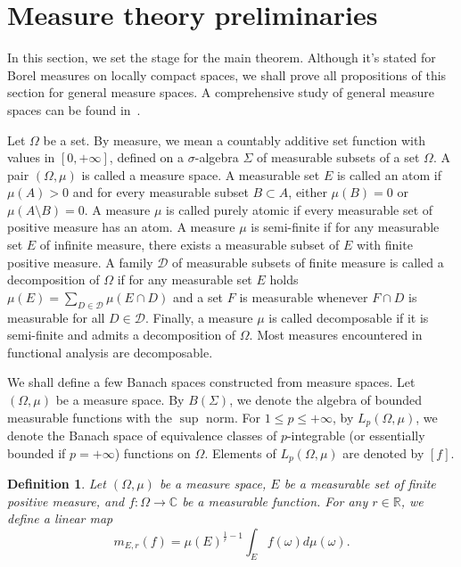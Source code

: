 \documentclass[12pt]{article}
\newtheorem{definition}[theorem]{Definition}
\begin{document}

\section{Measure theory preliminaries}
\label{MeasThPrelim}

In this section, we set the stage for the main theorem. Although it's stated 
for Borel measures on locally compact spaces, we shall prove all propositions of 
this section for general measure spaces. A comprehensive study of general 
measure spaces can be found in~\cite{FremMeasTh2}.

Let $\Omega$ be a set. By measure, we mean a countably additive set function 
with values in $[0,+\infty]$, defined on a $\sigma$-algebra $\Sigma$ of 
measurable subsets of a set $\Omega$. A pair $(\Omega,\mu)$ is 
called a measure space. A measurable set $E$ is called an atom 
if $\mu(A)>0$ and for every measurable subset $B\subset A$, either $\mu(B)=0$ 
or $\mu(A\setminus B)=0$. A measure $\mu$ is called purely atomic if every 
measurable set of positive measure has an atom. A measure $\mu$ is semi-finite 
if for any measurable set $E$ of infinite measure, there exists a measurable 
subset of $E$ with finite positive measure. A family $\mathcal{D}$ of 
measurable subsets of finite measure is called a decomposition of $\Omega$ if 
for any measurable set $E$ holds $\mu(E)=\sum_{D\in\mathcal{D}}\mu(E\cap D)$ 
and a set $F$ is measurable whenever $F\cap D$ is measurable for 
all $D\in\mathcal{D}$. Finally, a measure $\mu$ is called decomposable if it 
is semi-finite and admits a decomposition of $\Omega$. Most measures 
encountered in functional analysis are decomposable. 

We shall define a few Banach spaces constructed from measure spaces. 
Let $(\Omega,\mu)$ be a measure space. By $B(\Sigma)$, we denote the algebra of 
bounded measurable functions with the $\sup$ norm. For $1\leq p\leq +\infty$, 
by $L_p(\Omega,\mu)$, we denote the Banach space of equivalence classes of 
$p$-integrable (or essentially bounded if $p=+\infty$) functions on $\Omega$. 
Elements of $L_p(\Omega,\mu)$ are denoted by $[f]$.

\begin{definition}\label{GnrlzdMean}
    Let $(\Omega,\mu)$ be a measure space, $E$ be a measurable set of finite 
    positive measure, and $f:\Omega\to\mathbb{C}$ be a measurable function. For 
    any $r\in\mathbb{R}$, we define a linear map
    \[
        m_{E,r}(f)=\mu(E)^{\frac{1}{r}-1}\int_E f(\omega)d\mu(\omega).
    \]
\end{definition}
\end{document}
